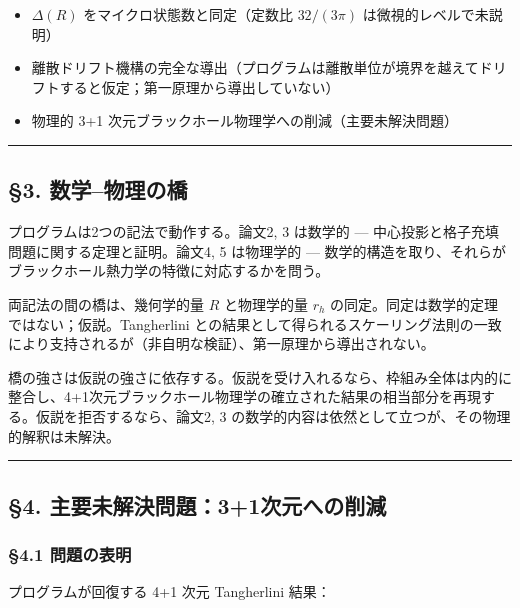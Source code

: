 \documentclass[a4paper,11pt]{ltjsarticle}
\theoremstyle{definition}
\providecommand{\tightlist}{\setlength{\itemsep}{0pt}\setlength{\parskip}{0pt}}
\begin{document}
\begin{itemize}
\tightlist
\item
  \(\Delta(R)\) をマイクロ状態数と同定（定数比 \(32/(3\pi)\)
  は微視的レベルで未説明）
\item
  離散ドリフト機構の完全な導出（プログラムは離散単位が境界を越えてドリフトすると仮定；第一原理から導出していない）
\item
  物理的 3+1 次元ブラックホール物理学への削減（主要未解決問題）
\end{itemize}

\begin{center}\rule{0.5\linewidth}{0.5pt}\end{center}

\subsection{§3.
数学--物理の橋}\label{ux6570ux5b66ux7269ux7406ux306eux6a4b}

プログラムは2つの記法で動作する。論文2, 3 は数学的 ---
中心投影と格子充填問題に関する定理と証明。論文4, 5 は物理学的 ---
数学的構造を取り、それらがブラックホール熱力学の特徴に対応するかを問う。

両記法の間の橋は、幾何学的量 \(R\) と物理学的量 \(r_h\)
の同定。同定は数学的定理ではない；仮説。Tangherlini
との結果として得られるスケーリング法則の一致により支持されるが（非自明な検証）、第一原理から導出されない。

橋の強さは仮説の強さに依存する。仮説を受け入れるなら、枠組み全体は内的に整合し、4+1次元ブラックホール物理学の確立された結果の相当部分を再現する。仮説を拒否するなら、論文2,
3 の数学的内容は依然として立つが、その物理的解釈は未解決。

\begin{center}\rule{0.5\linewidth}{0.5pt}\end{center}

\subsection{§4.
主要未解決問題：3+1次元への削減}\label{ux4e3bux8981ux672aux89e3ux6c7aux554fux984c31ux6b21ux5143ux3078ux306eux524aux6e1b}

\subsubsection{§4.1 問題の表明}\label{ux554fux984cux306eux8868ux660e}

プログラムが回復する 4+1 次元 Tangherlini 結果：
\end{document}

